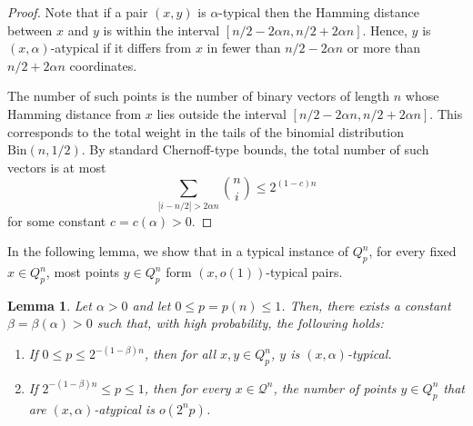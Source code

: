 \documentclass[11pt]{article}
\theoremstyle{definition}
\theoremstyle{plain}
\newtheorem{lemma}[definition]{Lemma}
\begin{document}
\begin{proof}
Note that if a pair \( (x, y) \) is \(\alpha\)-typical then the Hamming distance between \( x \) and \( y \) is within the interval \([n/2 - 2\alpha n, n/2 + 2\alpha n]\). Hence, \( y \) is \((x, \alpha)\)-atypical if it differs from \( x \) in fewer than \( n/2 - 2\alpha n \) or more than \( n/2 + 2\alpha n \) coordinates.

The number of such points is the number of binary vectors of length \( n \) whose Hamming distance from \( x \) lies outside the interval \( [n/2 - 2\alpha n, n/2 + 2\alpha n] \). This corresponds to the total weight in the tails of the binomial distribution \( \mathrm{Bin}(n, 1/2) \). By standard Chernoff-type bounds, the total number of such vectors is at most
\[
\sum_{|i - n/2| > 2\alpha n} \binom{n}{i} \leq 2^{(1 - c)n}
\]
for some constant \( c = c(\alpha) > 0 \).
\end{proof}


In the following lemma, we show that in a typical instance of \( Q_p^n \), for every fixed \( x \in Q_p^n \), most points \( y \in Q_p^n \) form \((x, o(1))\)-typical pairs.

\begin{lemma} \label{lem: no too many atypical}
Let \( \alpha > 0 \) and let \( 0 \leq p = p(n) \leq 1 \). Then, there exists a constant \( \beta = \beta(\alpha) > 0 \) such that, with high probability, the following holds:
\begin{enumerate}
    \item If \( 0 \leq p \leq 2^{-(1 - \beta)n} \), then for all \( x, y \in Q_p^n \), \( y \) is \((x, \alpha)\)-typical.
    
    \item If \( 2^{-(1 - \beta)n} \leq p \leq 1 \), then for every \( x \in \mathcal{Q}^n \), the number of points \( y \in Q_p^n \) that are \((x, \alpha)\)-atypical is \( o(2^n p) \).
\end{enumerate}
\end{lemma}
\end{document}
